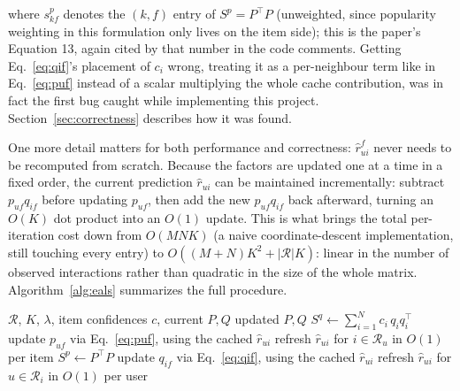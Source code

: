 where $s^p_{kf}$ denotes the $(k,f)$ entry of $S^p = P^\top P$ (unweighted,
since popularity weighting in this formulation only lives on the item
side); this is the paper's Equation 13, again cited by that number in the
code comments. Getting Eq.~\ref{eq:qif}'s
placement of $c_i$ wrong, treating it as a per-neighbour term like in
Eq.~\ref{eq:puf} instead of a scalar multiplying the whole cache
contribution, was in fact the first bug caught while implementing this
project. Section~\ref{sec:correctness} describes how it was found.

\medskip
One more detail matters for both performance and correctness:
$\hat r_{ui}^f$ never needs to be recomputed from scratch. Because the
factors are updated one at a time in a fixed order, the current prediction
$\hat r_{ui}$ can be maintained incrementally: subtract $p_{uf}q_{if}$
before updating $p_{uf}$, then add the new $p_{uf}q_{if}$ back afterward,
turning an $O(K)$ dot product into an $O(1)$ update. This is what brings the total
per-iteration cost down from $O(MNK)$ (a naive coordinate-descent
implementation, still touching every entry) to
$O((M+N)K^2+|\mathcal{R}|K)$: linear in the number of observed
interactions rather than quadratic in the size of the whole matrix.
Algorithm~\ref{alg:eals} summarizes the full procedure.

\begin{algorithm}[H]
\caption{eALS -- one training iteration}
\label{alg:eals}
\begin{algorithmic}[1]
\Require $\mathcal{R}$, $K$, $\lambda$, item confidences $c$, current $P, Q$
\Ensure updated $P, Q$
\State $S^q \leftarrow \sum_{i=1}^N c_i\, q_i q_i^\top$
        \State update $p_{uf}$ via Eq.~\ref{eq:puf}, using the cached $\hat r_{ui}$
        \State refresh $\hat r_{ui}$ for $i \in \mathcal{R}_u$ in $O(1)$ per item
    \EndFor
\EndFor
\State $S^p \leftarrow P^\top P$
        \State update $q_{if}$ via Eq.~\ref{eq:qif}, using the cached $\hat r_{ui}$
        \State refresh $\hat r_{ui}$ for $u \in \mathcal{R}_i$ in $O(1)$ per user
    \EndFor
\EndFor
\end{algorithmic}
\end{algorithm}

